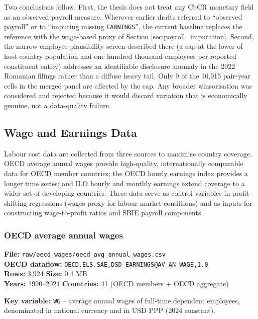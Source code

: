 \documentclass[11pt,a4paper]{article}
\newcommand{\code}[1]{\texttt{#1}}
\begin{document}
Two conclusions follow. First, the thesis does not treat any CbCR monetary field as an observed payroll measure. Wherever earlier drafts referred to ``observed payroll'' or to ``imputing missing \code{EARNINGS}'', the current baseline replaces the reference with the wage-based proxy of Section \ref{sec:payroll_imputation}. Second, the narrow employee plausibility screen described there (a cap at the lower of host-country population and one hundred thousand employees per reported constituent entity) addresses an identifiable disclosure anomaly in the 2022 Romanian filings rather than a diffuse heavy tail. Only 9 of the 16{,}915 pair-year cells in the merged panel are affected by the cap. Any broader winsorisation was considered and rejected because it would discard variation that is economically genuine, not a data-quality failure.

\subsection{Wage and Earnings Data}\label{sec:wages_appendix}

Labour cost data are collected from three sources to maximise country coverage. OECD average annual wages provide high-quality, internationally comparable data for OECD member countries; the OECD hourly earnings index provides a longer time series; and ILO hourly and monthly earnings extend coverage to a wider set of developing countries.  These data serve as control variables in profit-shifting regressions (wages proxy for labour market conditions) and as inputs for constructing wage-to-profit ratios and SBIE payroll components.

\subsubsection{OECD average annual wages}

\textbf{File:} \texttt{raw/oecd\_wages/oecd\_avg\_annual\_wages.csv}\\
\textbf{OECD dataflow:} \texttt{OECD.ELS.SAE,DSD\_EARNINGS@AV\_AN\_WAGE,1.0}\\
\textbf{Rows:} 3{,}924 \quad \textbf{Size:} 0.4 MB\\
\textbf{Years:} 1990--2024 \quad \textbf{Countries:} 41 (OECD members + OECD aggregate)

\noindent\textbf{Key variable:} \code{WG} -- average annual wages of full-time dependent employees, denominated in national currency and in USD PPP (2024 constant).
\end{document}
